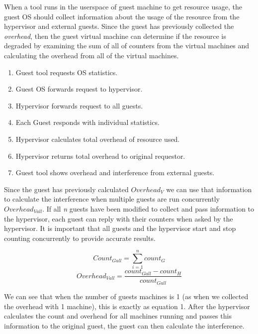 \indent When a tool runs in the userspace of guest machine to get resource usage, the guest OS should collect information about the usage of the resource from the hypervisor and external guests.  Since the guest has previously collected the \emph{overhead}, then the guest virtual machine can determine if the resource is degraded by examining the sum of all of counters from the virtual machines and calculating the overhead from all of the virtual machines.

\begin{enumerate}
	\item Guest tool requests OS statistics.
	\item Guest OS forwards request to hypervisor.
	\item Hypervisor forwards request to all guests.
	\item Each Guest responds with individual statistics.
	\item Hypervisor calculates total overhead of resource used.
	\item Hypervisor returns total overhead to original requestor.
	\item Guest tool shows overhead and interference from external guests.
\end{enumerate}

\indent Since the guest has previously calculated $ Overhead_V $ we can use that information to calculate the interference when multiple guests are run concurrently $ Overhead_{Vall} $.  If all \emph{n} guests have been modified to collect and pass information to the hypervisor, each guest can reply with their counters when asked by the hypervisor.  It is important that all guests and the hypervisor start and stop counting concurrently to provide accurate results.  

\[ Count_{Gall} = \sum_{i=1}^n{count_G} \] 
\begin{equation}
Overhead_{Vall} = \frac{count_{Gall} - count_H}{count_{Gall}} 
\label{eq2}
\end{equation}

We can see that when the number of guests machines is 1 (as when we collected the overhead with 1 machine), this is exactly as equation 1.  After the hypervisor calculates the count and overhead for all machines running and passes this information to the original guest, the guest can then calculate the interference.  

